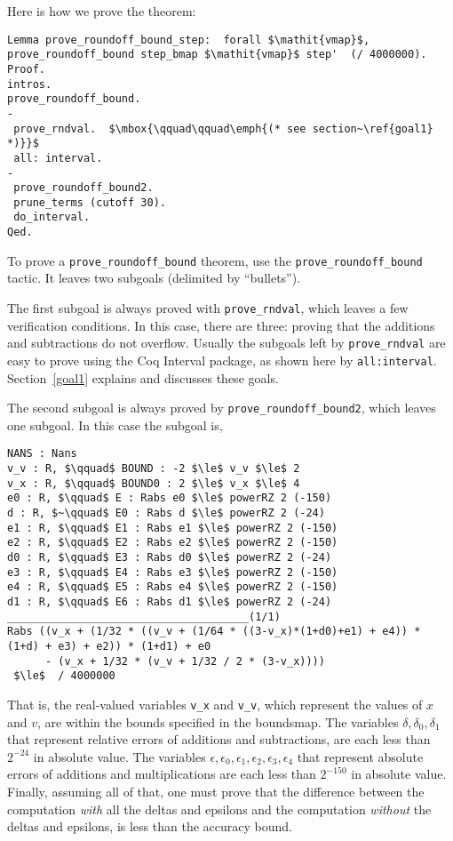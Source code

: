 \documentclass[article]{memoir}
\begin{document}
Here is how we prove the theorem:
\begin{lstlisting}
Lemma prove_roundoff_bound_step:  forall $\mathit{vmap}$, prove_roundoff_bound step_bmap $\mathit{vmap}$ step'  (/ 4000000).
Proof.
intros.
prove_roundoff_bound.
-
 prove_rndval.  $\mbox{\qquad\qquad\emph{(* see section~\ref{goal1} *)}}$
 all: interval.
- 
 prove_roundoff_bound2.
 prune_terms (cutoff 30).
 do_interval.
Qed.
\end{lstlisting}
To prove a \lstinline{prove_roundoff_bound} theorem,
use the \lstinline{prove_roundoff_bound} tactic.
It leaves two subgoals (delimited by ``bullets'').

The first subgoal is always proved with \lstinline{prove_rndval},
which leaves a few verification conditions.
In this case, there are three: proving that the additions
and subtractions do not overflow.  Usually the subgoals
left by \lstinline{prove_rndval} are easy to prove using the Coq
Interval package, as shown here by \lstinline{all:interval}.
Section~\ref{goal1} explains and discusses these goals.

The second subgoal
is always proved by
\lstinline{prove_roundoff_bound2}, which leaves
one subgoal.  In this case the subgoal is,

\begin{lstlisting}
NANS : Nans
v_v : R, $\qquad$ BOUND : -2 $\le$ v_v $\le$ 2
v_x : R, $\qquad$ BOUND0 : 2 $\le$ v_x $\le$ 4
e0 : R, $\qquad$ E : Rabs e0 $\le$ powerRZ 2 (-150)
d : R, $~\qquad$ E0 : Rabs d $\le$ powerRZ 2 (-24)
e1 : R, $\qquad$ E1 : Rabs e1 $\le$ powerRZ 2 (-150)
e2 : R, $\qquad$ E2 : Rabs e2 $\le$ powerRZ 2 (-150)
d0 : R, $\qquad$ E3 : Rabs d0 $\le$ powerRZ 2 (-24)
e3 : R, $\qquad$ E4 : Rabs e3 $\le$ powerRZ 2 (-150)
e4 : R, $\qquad$ E5 : Rabs e4 $\le$ powerRZ 2 (-150)
d1 : R, $\qquad$ E6 : Rabs d1 $\le$ powerRZ 2 (-24)
______________________________________(1/1)
Rabs ((v_x + (1/32 * ((v_v + (1/64 * ((3-v_x)*(1+d0)+e1) + e4)) * (1+d) + e3) + e2)) * (1+d1) + e0
      - (v_x + 1/32 * (v_v + 1/32 / 2 * (3-v_x))))
 $\le$  / 4000000
\end{lstlisting}
\label{stage2proofgoal}
That is, the real-valued variables \lstinline{v_x} and \lstinline{v_v},
which represent the values of $x$ and $v$, are within the bounds
specified in the boundsmap.  The variables 
$\delta,\delta_0,\delta_1$ that represent
relative errors of additions and subtractions, are each less than
$2^{-24}$ in absolute value.  The variables 
$\epsilon,\epsilon_0,\epsilon_1,\epsilon_2,\epsilon_3,\epsilon_4$ that
represent absolute errors of additions and multiplications
are each less than $2^{-150}$ in absolute value.
Finally, assuming all of that, one must prove that the
difference between the computation \emph{with} all the
deltas and epsilons and the computation \emph{without}
the deltas and epsilons, is less than the accuracy bound.
\end{document}
